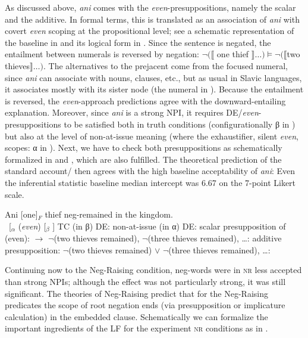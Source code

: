 \documentclass[output=paper,colorlinks,citecolor=brown]{langscibook}
\begin{document}
As discussed above, \textit{ani} comes with the \textit{even}-presuppositions, namely the scalar and the additive. In formal terms, this is translated as an association of \textit{ani} with covert \textit{even} scoping at the propositional level; see a schematic representation of the baseline in  and its logical form in . Since the sentence is negated, the entailment between numerals is reversed by negation:
$\neg (\llbracket$ one thief $\rrbracket \ldots) \models \neg(\llbracket$two
thieves$\rrbracket \ldots)$. The alternatives to the prejacent come from the focused numeral, since \textit{ani} can associate with nouns, clauses, etc., but as usual in Slavic languages, it associates mostly with its sister node (the numeral in ). Because the entailment is reversed, the \emph{even}-approach predictions agree with the downward-entailing explanation. Moreover, since \textit{ani} is a strong NPI, it requires DE/\textit{even}-presuppositions to be satisfied both in truth conditions (configurationally β in ) but also at the level of non-at-issue meaning (where the exhaustifier, silent \textit{even}, scopes: α in ). Next, we have to check both presuppositions as schematically formalized in  and , which are also fulfilled. The theoretical prediction of the standard account/\citet{gajewski2011licensing} then agrees with the high baseline acceptability of \textit{ani}: Even the inferential statistic baseline median intercept was 6.67 on the 7-point Likert scale.

  
\ea\label{ex-12} Ani [one]$_F$ thief neg-remained in the kingdom.\\
\ea\label{ex-12-a} ~{[}$_α$ (\textit{even}) {[}$_β$
  \neg [$_γ$ ani one thief remained in the kingdom ]{]} {]}
\ex TC  (in β) DE: {\langscicheckmark}
\ex non-at-issue (in α) DE:
  {\langscicheckmark}
\ex\label{ex-12-d} scalar presupposition of (even): $\rightarrow$
  $\neg$(two thieves remained), $\neg$(three thieves remained),
  \ldots: {\langscicheckmark}
\ex\label{ex-12-e} additive presupposition: $\neg$(two thieves
  remained) $\vee$ $\neg$(three thieves remained), \ldots:
  {\langscicheckmark} \z\z

\noindent Continuing now to the Neg-Raising condition, neg-words were in \textsc{nr} less accepted than strong NPIs; although the effect was not particularly strong, it was still significant. The theories of Neg-Raising \citep{gajewski2007neg,romoli2013scalar} predict that for the Neg-Raising predicates the scope of root negation ends (via presupposition or implicature calculation) in the embedded clause. Schematically we can formalize the important ingredients of the LF for the experiment \textsc{nr} conditions as in . 
\end{document}
